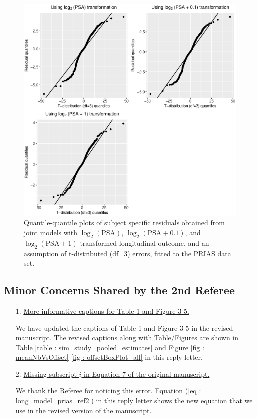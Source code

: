 \begin{enumerate}
        \begin{figure}[!htb]
        \centerline{\includegraphics[width=\columnwidth]{../images/model_fit/qqplot_various_log_transform_t3.eps}}
        \caption{Quantile-quantile plots of subject specific residuals obtained from joint models with $\log_2 (\mbox{PSA})$, $\log_2(\mbox{PSA}+0.1)$, and $\log_2(\mbox{PSA}+1)$ transformed longitudinal outcome, and an assumption of t-distributed (df=3) errors, fitted to the PRIAS data set.}
        \label{fig : qqplot_various_log_transform_t3}
        \end{figure}

        
    \end{enumerate}

    \subsection*{Minor Concerns Shared by the 2nd Referee}

    \begin{enumerate}
        \item[1.] \underline{More informative captions for Table 1 and Figure 3-5.}

        We have updated the captions of Table 1 and Figure 3-5 in the revised manuscript. The revised captions along with Table/Figures are shown in Table \ref{table : sim_study_pooled_estimates} and Figure \ref{fig : meanNbVsOffset}-\ref{fig : offsetBoxPlot_all} in this reply letter.

        \item[2.] \underline{Missing subscript $i$ in Equation 7 of the original manuscript.}

        We thank the Referee for noticing this error. Equation (\ref{eq : long_model_prias_ref2}) in this reply letter shows the new equation that we use in the revised version of the manuscript.

    \end{enumerate}


